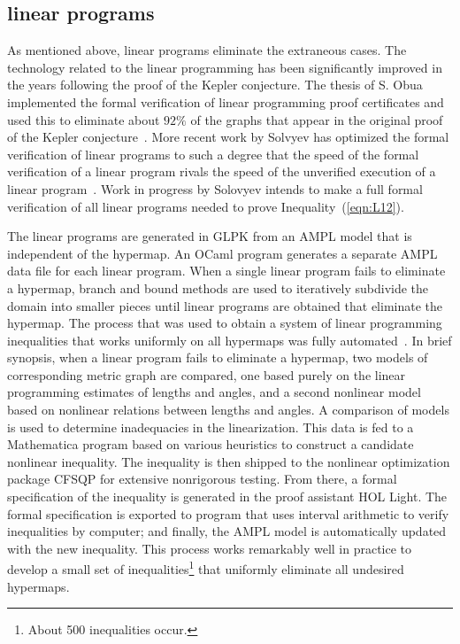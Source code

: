 \documentclass{llncs}
\begin{document}
\subsection{linear programs}

As mentioned above, linear programs eliminate the extraneous cases.
The technology related to the linear programming has been
significantly improved in the years following the proof of the Kepler
conjecture.  The thesis of S. Obua implemented
the formal verification of linear programming proof certificates and
used this to eliminate about $92\%$ of the graphs that appear in the
original proof of the Kepler conjecture~\cite{Obua:2008:Thesis}.  More
recent work by Solvyev has optimized the formal verification of linear
programs to such a degree that the speed of the formal verification of
a linear program rivals the speed of the unverified execution of a
linear program~\cite{Solovyev:LP}.  Work in progress by Solovyev
intends to make a full formal verification of all linear programs needed to
prove Inequality~(\ref{eqn:L12}).

The linear programs are generated in GLPK from an AMPL model that is
independent of the hypermap.  An OCaml program generates a
separate AMPL data file for each linear program.  When a single linear
program fails to eliminate a hypermap, branch and bound methods are
used to iteratively subdivide the domain into smaller pieces until
linear programs are obtained that eliminate the hypermap.  The process
that was used to obtain a system of linear programming inequalities
that works uniformly on all hypermaps was fully
automated~\cite{Hales:2010:lin-prog}.  In brief synopsis, when a
linear program fails to eliminate a hypermap, two models of
corresponding metric graph are compared, one based purely on the
linear programming estimates of lengths and angles, and a second
nonlinear model based on nonlinear relations between lengths and
angles.  A comparison of models is used to determine inadequacies in
the linearization.  This data is fed to a Mathematica program based on
various heuristics to construct a candidate nonlinear inequality.  The
inequality is then shipped to the nonlinear optimization package
{CFSQP} for extensive nonrigorous testing.  From there, a formal
specification of the inequality is generated in the proof assistant
HOL Light.  The formal specification is exported to program that uses
interval arithmetic to verify inequalities by computer; and finally,
the AMPL model is automatically updated with the new inequality.  This
process works remarkably well in practice to develop a small set of
inequalities\footnote{About 500 inequalities occur.} that
uniformly eliminate all undesired hypermaps.
\end{document}
